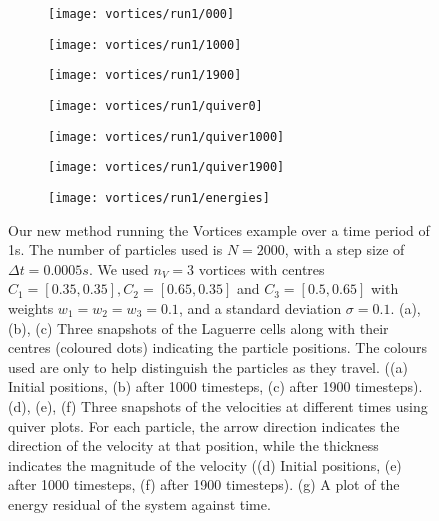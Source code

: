 \documentclass[11pt, oneside]{article}   	%
\newcommand{\dt}{\Delta t}
\begin{document}
\begin{figure}[H]
   \begin{subfigure}[t]{0.25\textwidth}
        \centering
        \texttt{[image: vortices/run1/000]}
        \caption{} \label{fig:vortices-000}
    \end{subfigure}
   \begin{subfigure}[t]{0.25\textwidth}
        \centering
	\texttt{[image: vortices/run1/1000]}
        \caption{} \label{fig:vortices-1000}
    \end{subfigure}
   \begin{subfigure}[t]{0.25\textwidth}
        \centering
	\texttt{[image: vortices/run1/1900]}
        \caption{} \label{fig:vortices-1900}
    \end{subfigure}
   \begin{subfigure}[t]{0.25\textwidth}
        \centering
        \texttt{[image: vortices/run1/quiver0]}
        \caption{} \label{fig:vortices-quiver0}
    \end{subfigure}
   \begin{subfigure}[t]{0.25\textwidth}
        \centering
        \texttt{[image: vortices/run1/quiver1000]}
        \caption{} \label{fig:vortices-quiver1000}
    \end{subfigure}
   \begin{subfigure}[t]{0.25\textwidth}
        \centering
        \texttt{[image: vortices/run1/quiver1900]}
        \caption{} \label{fig:vortices-quiver1900}
    \end{subfigure}
   \begin{subfigure}[t]{1.\textwidth}
        \centering
	\texttt{[image: vortices/run1/energies]}
        \caption{} \label{fig:vortices-energies}
    \end{subfigure}
\centering
\caption{Our new method running the Vortices example over a time period of 1s. The number of particles used is \(N = 2000\), with a step size of \(\dt = 0.0005s\). We used \(n_V = 3\) vortices with centres \(C_1 = [0.35, 0.35], C_2 = [0.65, 0.35] \) and \(C_3 = [0.5, 0.65]\) with weights \(w_1 = w_2 = w_3 = 0.1\), and a standard deviation \(\sigma = 0.1\). (a), (b), (c) Three snapshots of the Laguerre cells along with their centres (coloured dots) indicating the particle positions. The colours used are only to help distinguish the particles as they travel. ((a) Initial positions, (b) after 1000 timesteps, (c) after 1900 timesteps). (d), (e), (f) Three snapshots of the velocities at different times using quiver plots. For each particle, the arrow direction indicates the direction of the velocity at that position, while the thickness indicates the magnitude of the velocity ((d) Initial positions, (e) after 1000 timesteps, (f) after 1900 timesteps). (g) A plot of the energy residual of the system against time. }
\centering
\label{fig:vortices}
\end{figure}
\end{document}
